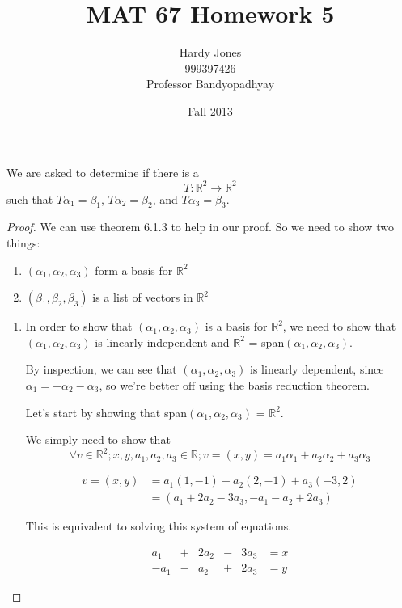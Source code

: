 \documentclass[12pt,letterpaper]{article}
\title{MAT 67 Homework 5\vspace{-2ex}}
\author{Hardy Jones\\
        999397426\\
        Professor Bandyopadhyay\vspace{-2ex}}
\date{Fall 2013}
\begin{document}
  \maketitle

  We are asked to determine if there is a
  \[T: \mathbb{R}^2 \rightarrow \mathbb{R}^2\]
  such that $T\alpha_1 = \beta_1$, $T\alpha_2 = \beta_2$, and $T\alpha_3 = \beta_3$.

  \begin{proof}
    We can use theorem 6.1.3 to help in our proof.
    So we need to show two things:

    \begin{enumerate}
      \item $(\alpha_1, \alpha_2, \alpha_3)$ form a basis for $\mathbb{R}^2$
      \item $(\beta_1, \beta_2, \beta_3)$ is a list of vectors in $\mathbb{R}^2$
    \end{enumerate}

    \begin{enumerate}
      \item
        In order to show that $(\alpha_1, \alpha_2, \alpha_3)$ is a basis for $\mathbb{R}^2$,
        we need to show that $(\alpha_1, \alpha_2, \alpha_3)$ is linearly independent
        and $\mathbb{R}^2$ = span$(\alpha_1, \alpha_2, \alpha_3)$.

        By inspection, we can see that $(\alpha_1, \alpha_2, \alpha_3)$ is linearly dependent,
        since $\alpha_1 = -\alpha_2 - \alpha_3$, so we're better off using the basis reduction theorem.

        Let's start by showing that span$(\alpha_1, \alpha_2, \alpha_3)$ = $\mathbb{R}^2$.

        We simply need to show that
        \[\forall v \in \mathbb{R}^2; x, y, a_1, a_2, a_3 \in \mathbb{R}; v = (x, y) = a_1\alpha_1 + a_2\alpha_2 + a_3\alpha_3\]

        \begin{align*}
          v = (x, y) &= a_1(1, -1) + a_2(2, -1) + a_3(-3, 2) \\
          &= (a_1 + 2a_2 -3a_3, -a_1 - a_2 + 2a_3)
        \end{align*}

        This is equivalent to solving this system of equations.

        \begin{align*}
          a_1 & + & 2a_2 & - & 3a_3 & = x \\
          -a_1 & - & a_2 & + & 2a_3 & = y
        \end{align*}


\end{enumerate}
\end{proof}
\end{document}
